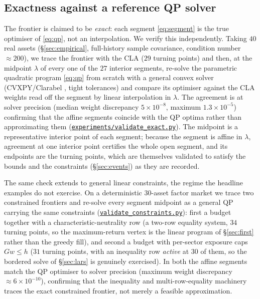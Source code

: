 \documentclass[11pt]{article}
\newcommand{\repourl}{https://github.com/cvxgrp/cvxcla}
\newcommand{\srcref}{v1.8.1}
\newcommand{\srcfile}[2]{\href{\repourl/blob/\srcref/#1}{\texttt{#2}}}
\begin{document}
\subsection{Exactness against a reference QP solver}
\label{sec:exactness}

The frontier is claimed to be \emph{exact}: each segment \eqref{eq:segment} is the
true optimiser of \eqref{eq:qp}, not an interpolation. We verify this
independently. Taking $40$ real assets (\S\ref{sec:empirical}, full-history
sample covariance, condition number $\approx 200$), we trace the frontier with
the CLA ($29$ turning points) and then, at the midpoint $\lambda$ of every one of
the $27$ interior segments, re-solve the parametric quadratic program
\eqref{eq:qp} from scratch with a general convex solver (CVXPY/Clarabel
\citep{cvxpy}, tight tolerances) and compare its optimiser against the CLA weights
read off the segment by linear interpolation in $\lambda$. The agreement is at
solver precision (median weight discrepancy $5\times 10^{-8}$, maximum
$1.3\times 10^{-5}$) confirming that the affine segments coincide with the QP
optima rather than approximating them (\srcfile{experiments/validate_exact.py}{experiments/validate\_exact.py}).
The midpoint is a representative interior point of each segment; because the segment
is affine in $\lambda$, agreement at one interior point certifies the whole open
segment, and its endpoints are the turning points, which are themselves validated to
satisfy the bounds and the constraints (\S\ref{sec:events}) as they are recorded.

The same check extends to general linear constraints, the regime the headline
examples do not exercise. On a deterministic $30$-asset factor market we trace two
constrained frontiers and re-solve every segment midpoint as a general QP carrying
the same constraints
(\srcfile{experiments/validate_constraints.py}{validate\_constraints.py}):
first a budget together with a characteristic-neutrality row (a two-row equality
system, $34$ turning points, so the maximum-return vertex is the linear program of
\S\ref{sec:first} rather than the greedy fill), and second a budget with per-sector
exposure caps $G w \le h$ ($31$ turning points, with an inequality row \emph{active}
at $30$ of them, so the bordered solve of \S\ref{sec:lars} is genuinely exercised).
In both the affine segments match the QP optimiser to solver precision (maximum
weight discrepancy $\approx 6\times 10^{-10}$), confirming that the inequality and
multi-row-equality machinery traces the exact constrained frontier, not merely a
feasible approximation.
\end{document}
